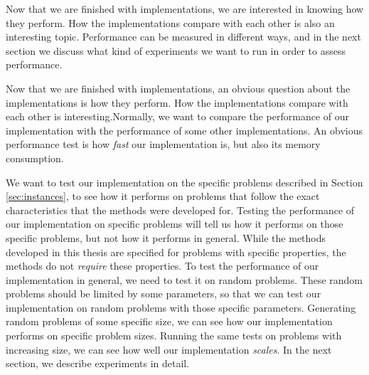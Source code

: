 Now that we are finished with implementations, we are interested in knowing
how they perform.
How the implementations compare with each other is also an interesting topic.
Performance can be measured in different ways, and in the next section we
discuss what kind of experiments we want to run in order to assess performance.



Now that we are finished with implementations, an obvious question about the
implementations is how they perform. How the implementations compare with
each other is interesting.Normally, we want to compare the performance
of our implementation with the performance of some other implementations.
An obvious performance test is how \emph{fast} our implementation is, but also
its memory consumption.

We want to test our implementation on the specific problems described in
Section \ref{sec:instances}, to see how it performs on problems that follow
the exact characteristics that the methods were developed for.
Testing the performance of our implementation on specific problems will tell us
how it performs on those specific problems, but not how it performs in general.
While the methods developed in this thesis are specified for problems with
specific properties, the methods do not \emph{require} these properties.
To test the performance of our implementation in general, we need to test it
on random problems.
These random problems should be limited by some parameters, so that we can test
our implementation on random problems with those specific parameters.
Generating random problems of some specific size, we can see how our
implementation performs on specific problem sizes. Running the same
tests on problems with increasing size, we can see how well our implementation
\emph{scales}. In the next section, we describe experiments in detail.
